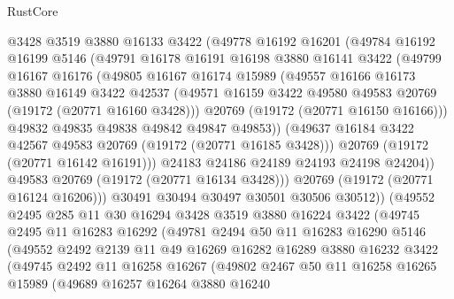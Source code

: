 \begin{lexlean}{RustCore}
\begin{coremodule}
            @3428
            @3519
            @3880
            @16133
            @3422
            (@49778
              @16192
              @16201
              (@49784
                @16192
                @16199
                @5146
                (@49791
                  @16178
                  @16191
                  @16198
                  @3880
                  @16141
                  @3422
                  (@49799
                    @16167
                    @16176
                    (@49805
                      @16167
                      @16174
                      @15989
                      (@49557
                        @16166
                        @16173
                        @3880
                        @16149
                        @3422
                        @42537
                        (@49571 @16159 @3422 @49580 @49583 @20769 (@19172 (@20771 @16160 @3428)))
                        @20769
                        (@19172 (@20771 @16150 @16166)))
                      @49832
                      @49835
                      @49838
                      @49842
                      @49847
                      @49853))
                  (@49637 @16184 @3422 @42567 @49583 @20769 (@19172 (@20771 @16185 @3428)))
                  @20769
                  (@19172 (@20771 @16142 @16191)))
                @24183
                @24186
                @24189
                @24193
                @24198
                @24204))
            @49583
            @20769
            (@19172 (@20771 @16134 @3428)))
          @20769
          (@19172 (@20771 @16124 @16206)))
        @30491
        @30494
        @30497
        @30501
        @30506
        @30512))
    (@49552
      @2495
      @285
      @11
      @30
      @16294
      @3428
      @3519
      @3880
      @16224
      @3422
      (@49745
        @2495
        @11
        @16283
        @16292
        (@49781
          @2494
          @50
          @11
          @16283
          @16290
          @5146
          (@49552
            @2492
            @2139
            @11
            @49
            @16269
            @16282
            @16289
            @3880
            @16232
            @3422
            (@49745
              @2492
              @11
              @16258
              @16267
              (@49802
                @2467
                @50
                @11
                @16258
                @16265
                @15989
                (@49689
                  @16257
                  @16264
                  @3880
                  @16240

\end{coremodule}
\end{lexlean}
